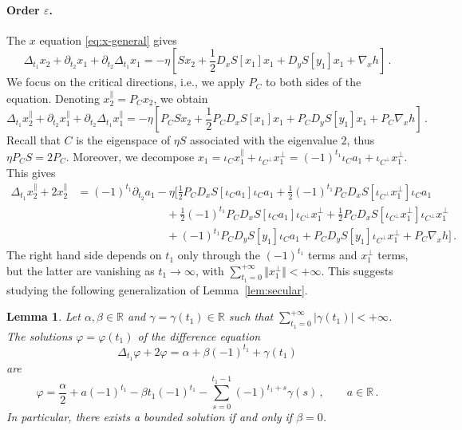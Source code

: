 \documentclass[11pt,english,reqno]{article}
\newcommand{\R}{\mathbb{R}}
\theoremstyle{plain}
\newtheorem{lem}[proposition]{Lemma}
\theoremstyle{definition}
\theoremstyle{remark}
\numberwithin{equation}{section}
\begin{document}
\paragraph{Order $\varepsilon$.} The $x$ equation \eqref{eq:x-general} gives
    \begin{equation*}
        \Delta_{t_1} x_2 + \partial_{t_2} x_1 + \partial_{t_2} \Delta_{t_1} x_1 = - \eta \left[S x_2 + \frac{1}{2} D_x S[x_1] x_1 + D_y S[y_1] x_1 + \nabla_x h\right] \, .
    \end{equation*}
    We focus on the critical directions, i.e., we apply $P_C$ to both sides of the equation. Denoting $x_2^\parallel = P_C x_2$, we obtain
    \begin{equation*}
        \Delta_{t_1} x_2^\parallel + \partial_{t_2} x_1^\parallel + \partial_{t_2} \Delta_{t_1} x_1^\parallel = - \eta \left[P_C S 
        x_2 + \frac{1}{2} P_C D_x S[x_1] x_1 + P_C D_y S[y_1] x_1 + P_C \nabla_x h\right] \, .
    \end{equation*}
Recall that $C$ is the eigenspace of $\eta S$ associated with the eigenvalue $2$, thus $\eta P_C S = 2 P_C$. Moreover, we decompose $x_1 = \iota_C x_1^\parallel + \iota_{C^\perp} x_1^\perp = (-1)^{t_1} \iota_C a_1 + \iota_{C^\perp} x_1^\perp$. This gives
    \begin{align*}
        \Delta_{t_1} x_2^\parallel + 2 x_2^\parallel &= (-1)^{t_1} \partial_{t_2} a_1 - \eta \bigg[\frac{1}{2} P_C D_x S[\iota_Ca_1] \iota_C a_1 + \frac{1}{2}(-1)^{t_1} P_C D_x S[\iota_{C^\perp} x_1^\perp] \iota_Ca_1 \\
        &\hspace{8em}+ \frac{1}{2}(-1)^{t_1} P_C D_x S[\iota_C a_1] \iota_{C^\perp} x_1^\perp + \frac{1}{2}P_C D_x S[\iota_{C^\perp} x_1^\perp] \iota_{C^\perp} x_1^\perp \\
        &\hspace{8em}+ (-1)^{t_1} P_C D_y S[y_1] \iota_Ca_1 + P_C D_y S[y_1] \iota_{C^\perp} x_1^\perp + P_C \nabla_x h\bigg] \, .
    \end{align*}
    The right hand side depends on $t_1$ only through the $(-1)^{t_1}$ terms and $x_1^\perp$ terms, but the latter are vanishing as $t_1 \to \infty$, with $\sum_{t_1 = 0}^{+\infty} \Vert x_1^\perp \Vert < +\infty$. This suggests studying the following generalization of Lemma~\ref{lem:secular}.

    \begin{lem}
        \label{lem:secular-general}
        Let $\alpha, \beta \in \R$ and $\gamma = \gamma(t_1) \in \R$ such that $\sum_{t_1=0}^{+\infty} |\gamma(t_1)| < +\infty$. The solutions $\varphi = \varphi(t_1)$ of the difference equation
        \begin{equation*}
            \Delta_{t_1} \varphi + 2 \varphi = \alpha + \beta (-1)^{t_1} + \gamma(t_1)
        \end{equation*}
        are 
        \begin{equation*}
            \varphi = \frac{\alpha}{2} + a (-1)^{t_1} - \beta t_1 (-1)^{t_1} - \sum_{s=0}^{t_1-1} (-1)^{t_1+s} \gamma(s) \, , \qquad a \in \R \, .
        \end{equation*} 
        In particular, there exists a bounded solution if and only if $\beta = 0$.
    \end{lem}
\end{document}
